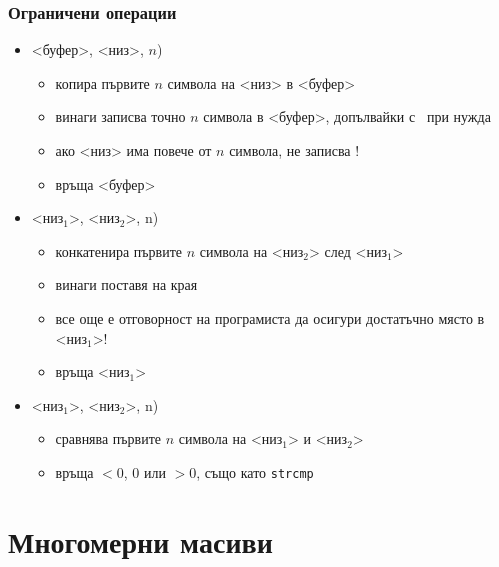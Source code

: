 \documentclass[alsotrans]{beamerswitch}
\newcommand{\s}{<низ>\xspace}
\renewcommand{\ss}[1]{<низ$_{#1}$>\xspace}
\renewcommand{\b}{<буфер>\xspace}
\begin{document}
\begin{frame}
  \frametitle{Ограничени операции}

  \begin{itemize}[<+->]
  \item {}\b, \s, $n$\tta)
    \begin{itemize}
    \item копира първите $n$ символа на \s в \b
    \item винаги записва точно $n$ символа в \b, допълвайки с \term\ при нужда
    \item \alert{ако \s има повече от $n$ символа, не записва \term!}
    \item връща \b
    \end{itemize}
  \item {}\ss1, \ss2, n\tta)
    \begin{itemize}
    \item конкатенира първите $n$ символа на \ss2 след \ss1
    \item винаги поставя \term на края
    \item \alert{все още е отговорност на програмиста да осигури достатъчно място в \ss1!}
    \item връща \ss1
    \end{itemize}
  \item {}\ss1, \ss2, n\tta)
    \begin{itemize}
    \item сравнява първите $n$ символа на \ss1 и \ss2
    \item връща $<0$, $0$ или $>0$, също като \tt{strcmp}
    \end{itemize}
  \end{itemize}
\end{frame}

\section{Многомерни масиви}
\end{document}
